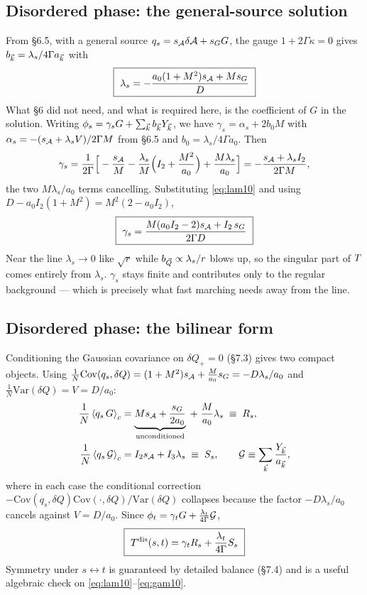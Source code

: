 \subsection{Disordered phase: the general-source solution}
From \S6.5, with a general source $q_s=s_{\mathcal{A}}\delta\mathcal{A}+s_G G$, the gauge $1+2\Gamma\kappa=0$
gives $b_{\vec k}=\lambda_s/4\Gamma a_{\vec k}$ with
\begin{equation}
  \boxed{\ \lambda_s=-\frac{a_0(1+M^{2})s_{\Ac}+M s_G}{D}\ }
  \label{eq:lam10}
\end{equation}
What \S6 did not need, and what is required here, is the coefficient of $G$ in the solution.
Writing $\phi_s=\gamma_s G+\sum_{\vec k}b_{\vec k}Y_{\vec k}$, we have $\gamma_s=\alpha_s+2b_0M$ with
$\alpha_s=-(s_{\mathcal{A}}+\lambda_s V)/2\Gamma M$ from \S6.5 and $b_0=\lambda_s/4\Gamma a_0$. Then
\begin{equation}
  \gamma_s=\frac{1}{2\Gamma}\Big[-\frac{s_{\mathcal{A}}}{M}-\frac{\lambda_s}{M}\Big(I_2+\frac{M^{2}}{a_0}\Big)
   +\frac{M\lambda_s}{a_0}\Big]
  =-\frac{s_{\mathcal{A}}+\lambda_s I_2}{2\Gamma M} ,
\end{equation}
the two $M\lambda_s/a_0$ terms cancelling. Substituting \eqref{eq:lam10} and using
$D-a_0I_2(1+M^{2})=M^{2}(2-a_0I_2)$,
\begin{equation}
  \boxed{\ \gamma_s=\frac{M(a_0I_2-2)s_{\Ac}+I_2\,s_G}{2\Gamma D}\ }
  \label{eq:gam10}
\end{equation}
 Near the line $\lambda_s\to0$ like $\sqrt r$ while
$b_{\vec Q}\propto\lambda_s/r$ blows up, so the singular part of $T$ comes entirely from
$\lambda_s$. $\gamma_s$ stays finite and contributes only to the regular background --- which
is precisely what fast marching needs away from the line.

\subsection{Disordered phase: the bilinear form}
Conditioning the Gaussian covariance on $\delta Q_+=0$ (\S7.3) gives two compact objects.
Using $\tfrac1N\mathrm{Cov}(q_s,\delta Q)=(1+M^{2})s_{\mathcal{A}}+\tfrac{M}{a_0}s_G=-D\lambda_s/a_0$
and $\tfrac1N\mathrm{Var}(\delta Q)=V=D/a_0$:
\begin{align}
  \frac1N\left\langle q_s\,G \right\rangle_c&=\underbrace{Ms_{\mathcal{A}}+\frac{s_G}{2a_0}}_{\text{unconditioned}}
   \;+\;\frac{M}{a_0}\lambda_s\;\equiv\;R_s ,
  \label{eq:Rs}\\
  \frac1N\left\langle q_s\,\mathcal{G} \right\rangle_c&=I_2s_{\mathcal{A}}+I_3\lambda_s\;\equiv\;S_s ,
  \qquad \mathcal{G}\equiv\sum_{\vec k}\frac{Y_{\vec k}}{a_{\vec k}} ,
  \label{eq:Ss}
\end{align}
where in each case the conditional correction $-\mathrm{Cov}(q_s,\delta Q)\mathrm{Cov}(\cdot,\delta Q)/\mathrm{Var}(\delta Q)$
collapses because the factor $-D\lambda_s/a_0$ cancels against $V=D/a_0$. Since
$\phi_t=\gamma_tG+\tfrac{\lambda_t}{4\Gamma}\mathcal{G}$,
\begin{equation}
  \boxed{\ T^{\rm dis}(s,t)=\gamma_t R_s+\frac{\lambda_t}{4\Gamma}S_s\ }
  \label{eq:bilin10}
\end{equation}
Symmetry under $s\leftrightarrow t$ is guaranteed by detailed balance (\S7.4) and is a useful
algebraic check on \eqref{eq:lam10}--\eqref{eq:gam10}.

